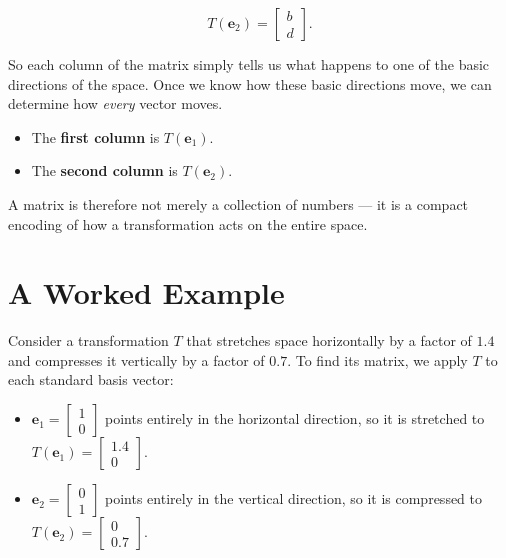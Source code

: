 \documentclass[11pt,openany]{book}
\theoremstyle{definition}
\begin{document}
\[
T(\mathbf{e}_2) = \begin{bmatrix} b \\ d \end{bmatrix}.
\]

\medskip

So each column of the matrix simply tells us what happens to one of the basic directions 
of the space. Once we know how these basic directions move, we can determine how 
\textit{every} vector moves.

\begin{itemize}
  \item The \textbf{first column} is $T(\mathbf{e}_1)$.
  \item The \textbf{second column} is $T(\mathbf{e}_2)$.
\end{itemize}

A matrix is therefore not merely a collection of numbers --- it is a compact encoding of 
how a transformation acts on the entire space.

\section{A Worked Example}

Consider a transformation $T$ that stretches space horizontally by a factor of $1.4$ and 
compresses it vertically by a factor of $0.7$. To find its matrix, we apply $T$ to each 
standard basis vector:

\begin{itemize}
  \item $\mathbf{e}_1 = \begin{bmatrix} 1 \\ 0 \end{bmatrix}$ points entirely in the 
  horizontal direction, so it is stretched to 
  $T(\mathbf{e}_1) = \begin{bmatrix} 1.4 \\ 0 \end{bmatrix}$.
  \item $\mathbf{e}_2 = \begin{bmatrix} 0 \\ 1 \end{bmatrix}$ points entirely in the 
  vertical direction, so it is compressed to 
  $T(\mathbf{e}_2) = \begin{bmatrix} 0 \\ 0.7 \end{bmatrix}$.
\end{itemize}
\end{document}
